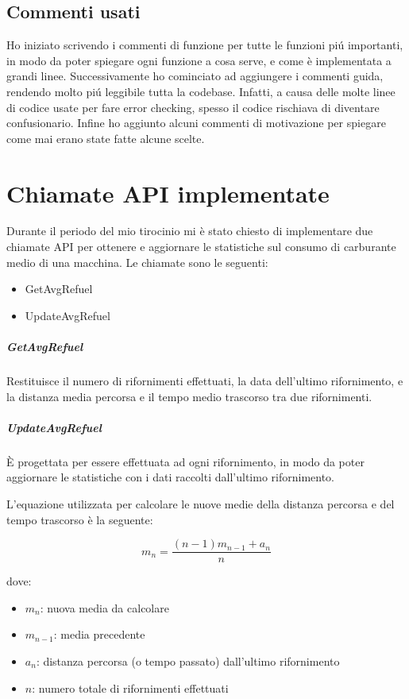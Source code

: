 \documentclass[italian, oneside]{sapthesis} %
\begin{document}
	\section{Commenti usati}
		Ho iniziato scrivendo i commenti di funzione per tutte le funzioni pi\'u importanti, in modo da poter spiegare ogni funzione a cosa serve, e come \`e implementata a grandi linee. Successivamente ho cominciato ad aggiungere i commenti guida, rendendo molto pi\'u leggibile tutta la codebase. Infatti, a causa delle molte linee di codice usate per fare error checking, spesso il codice rischiava di diventare confusionario. Infine ho aggiunto alcuni commenti di motivazione per spiegare come mai erano state fatte alcune scelte.


\chapter{Chiamate API implementate}
	Durante il periodo del mio tirocinio mi \`e stato chiesto di implementare due chiamate API per ottenere e aggiornare le statistiche sul consumo di carburante medio di una macchina.
	Le chiamate sono le seguenti:
	\begin{itemize}
		\item GetAvgRefuel
		\item UpdateAvgRefuel
	\end{itemize}

	\paragraph*{GetAvgRefuel} Restituisce il numero di rifornimenti effettuati, la data dell'ultimo rifornimento, e la distanza media percorsa e il tempo medio trascorso tra due rifornimenti.

	\paragraph*{UpdateAvgRefuel} \`E progettata per essere effettuata ad ogni rifornimento, in modo da poter aggiornare le statistiche con i dati raccolti dall'ultimo rifornimento.

	L'equazione utilizzata per calcolare le nuove medie della distanza percorsa e del tempo trascorso \`e la seguente:

	\[m_n=\frac{(n-1)m_{n-1}+a_n}{n}\]

	dove:
	\begin{itemize}
		\item \(m_n\): nuova media da calcolare
		\item \(m_{n-1}\): media precedente
		\item  \(a_n\): distanza percorsa (o tempo passato) dall'ultimo rifornimento
		\item \(n\): numero totale di rifornimenti effettuati
	\end{itemize}
\end{document}
